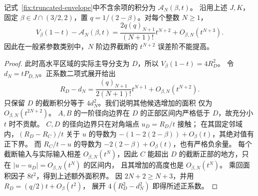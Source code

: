 \begin{corollary}[截断误差阶的不可提高性]\label{fix:truncation-sharp}
记式~\eqref{fix:truncated-envelope}中不含余项的积分为 $\mathcal A_N(\beta,t)$。
沿用上述 $J,K$，固定 $\beta\in J\cap(3/2,2)$，置 $q=1/(2-\beta)$。对每个整数 $N\ge1$，
\[
 V_\beta(1-t)-\mathcal A_N(\beta,t)
 =\frac{2q(q)_{N+1}}{(N+1)!}t^{N+2}+O_{\beta,N}(t^{N+3}).
\]
因此在一般紧参数类别中，$N$ 阶边界截断的 $t^{N+2}$ 误差阶不能提高。
\end{corollary}
\begin{proof}
此时高水平区域的实际主导分支为 $D$，所以 $V_\beta(1-t)=4R_D^2$。
令 $d_N=tP_{D,N}$。正系数二项式展开给出
\[
 R_D-d_N=\frac{(q)_{N+1}}{2(N+1)!}t^{N+1}+O_{\beta,N}(t^{N+2}).
\]
只保留 $D$ 的截断积分等于 $4d_N^2$。我们说明其他候选增加的面积
仅为 $O_{\beta,N}(t^{2N+2})$。
$A,B$ 的一阶径向边界在 $D$ 的正部区间内严格低于 $D$，故充分小 $t$ 时不贡献。
$C,D$ 的径向边界只在对角端点 $u_D=R_D/t$ 接触；
在其固定邻域内，$(R_D-R_C)/t$ 关于 $u$ 的导数为
$-(1-2(2-\beta))+O_\beta(t)$，其绝对值有正下界。
而 $R_C/t-u$ 的导数为 $-2(2-\beta)+O_\beta(t)$，也有严格负余量。
每个截断输入与实际输入相差 $O_{\beta,N}(t^N)$，因此 $C$ 能超出
$D$ 的截断正部的地方，只在 $|u-u_D|=O_{\beta,N}(t^N)$ 的区间内，
且其增加的高度也是 $O_{\beta,N}(t^N)$。
乘回面积因子 $8t^2$，得到上述额外面积界。
因 $2N+2\ge N+3$，并用 $R_D=(q/2)t+O_\beta(t^2)$，
展开 $4(R_D^2-d_N^2)$ 即得所述正系数。
\end{proof}
